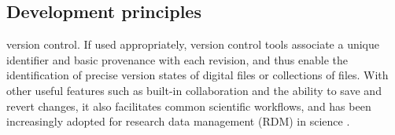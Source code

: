 {


\subsection{Development principles}


 version control. If used appropriately, version control tools associate a unique identifier and basic provenance with each revision, and thus enable the identification of precise version states of digital files or collections of files. With other useful features such as built-in collaboration and the ability to save and revert changes, it also facilitates common scientific workflows, and has been increasingly adopted for research data management (RDM) in science \citep{nord2019towards} \citep{strupler2017reproducibility} \citep{bryan2018excuse} \citep{corti2019managing}.



}
